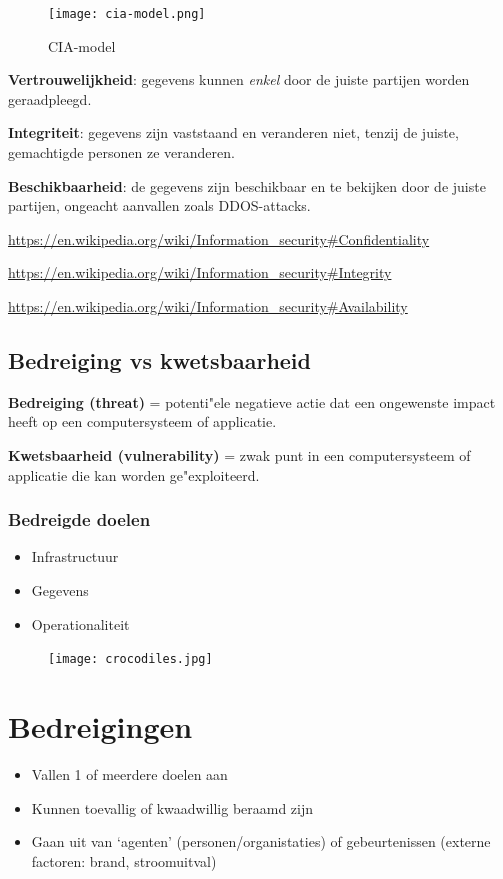 \documentclass{article}
\newcommand{\bold}[1]{\textbf{#1}}
\begin{document}
\begin{figure}[H]
    \centering
    \texttt{[image: cia-model.png]}
    \caption{CIA-model}
\end{figure}

\bold{Vertrouwelijkheid}: gegevens kunnen \textit{enkel} door de juiste partijen worden geraadpleegd.

\bold{Integriteit}: gegevens zijn vaststaand en veranderen niet, tenzij de juiste, gemachtigde personen ze veranderen.

\bold{Beschikbaarheid}: de gegevens zijn beschikbaar en te bekijken door de juiste partijen, ongeacht aanvallen zoals DDOS-attacks.

\url{https://en.wikipedia.org/wiki/Information_security#Confidentiality}

\url{https://en.wikipedia.org/wiki/Information_security#Integrity}

\url{https://en.wikipedia.org/wiki/Information_security#Availability}

\subsection{Bedreiging vs kwetsbaarheid}
\bold{Bedreiging (threat)} = potenti"ele negatieve actie dat een ongewenste impact heeft op een computersysteem of applicatie.

\bold{Kwetsbaarheid (vulnerability)} = zwak punt in een computersysteem of applicatie die kan worden ge"exploiteerd. 

\subsubsection{Bedreigde doelen}
\begin{itemize}
    \item Infrastructuur
    \item Gegevens
    \item Operationaliteit
\end{itemize}

\begin{figure}[H]
    \centering
    \texttt{[image: crocodiles.jpg]}
    \caption{}
\end{figure}

\section{Bedreigingen}

\begin{itemize}
    \item Vallen 1 of meerdere doelen aan
    \item Kunnen toevallig of kwaadwillig beraamd zijn
    \item Gaan uit van `agenten' (personen/organistaties) of gebeurtenissen (externe factoren: brand, stroomuitval)
\end{itemize}
\end{document}
